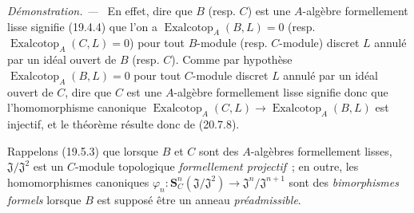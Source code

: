 \documentclass[10pt,oneside]{book}
\newenvironment{proof}{%
  \par\medskip\noindent\textit{Démonstration. ---\ }}{\par}
\begin{document}
\begin{proof}
En effet, dire que $B$ (resp. $C$) est une $A$-algèbre formellement lisse
signifie (19.4.4) que l'on a
$\operatorname{Exalcotop}_A(B,L)=0$ (resp.
$\operatorname{Exalcotop}_A(C,L)=0$) pour tout $B$-module (resp. $C$-module)
discret $L$ annulé par un idéal ouvert de $B$ (resp. $C$). Comme par hypothèse
$\operatorname{Exalcotop}_A(B,L)=0$ pour tout $C$-module discret $L$ annulé
par un idéal ouvert de $C$, dire que $C$ est une $A$-algèbre formellement lisse
signifie donc que l'homomorphisme canonique
$\operatorname{Exalcotop}_A(C,L)\longrightarrow
\operatorname{Exalcotop}_A(B,L)$ est injectif, et le théorème résulte donc de
(20.7.8).
\end{proof}

Rappelons (19.5.3) que lorsque $B$ et $C$ sont des $A$-algèbres formellement
lisses, $\mathfrak J/\mathfrak J^2$ est un $C$-module topologique
\emph{formellement projectif}~; en outre, les homomorphismes canoniques
$\varphi_n:\mathbf S_C^n(\mathfrak J/\mathfrak J^2)
\longrightarrow\mathfrak J^n/\mathfrak J^{n+1}$ sont des
\emph{bimorphismes formels} lorsque $B$ est supposé être un anneau
\emph{préadmissible}.
\end{document}
